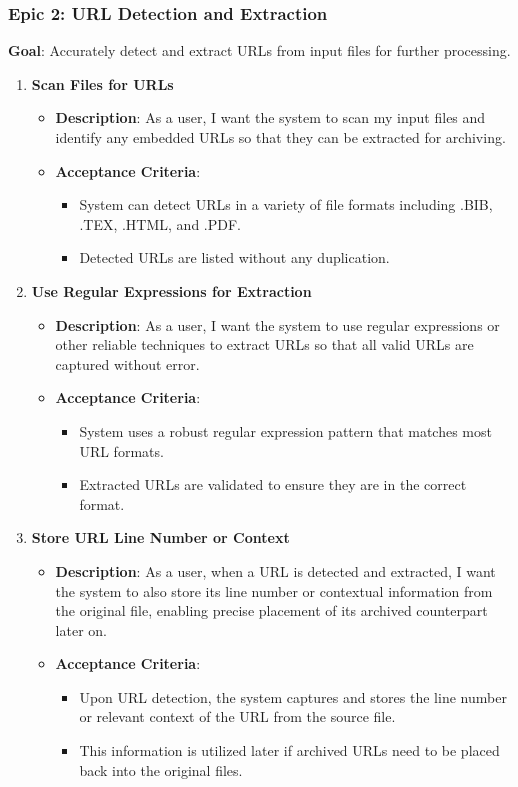 \subsubsection{Epic 2: URL Detection and Extraction}
\textbf{Goal}: Accurately detect and extract URLs from input files for further processing.

\begin{enumerate}
    \item \textbf{Scan Files for URLs}
    \begin{itemize}
        \item \textbf{Description}: As a user, I want the system to scan my input files and identify any embedded URLs so that they can be extracted for archiving.
        \item \textbf{Acceptance Criteria}:
        \begin{itemize}
            \item System can detect URLs in a variety of file formats including .BIB, .TEX, .HTML, and .PDF.
            \item Detected URLs are listed without any duplication.
        \end{itemize}
    \end{itemize}

    \item \textbf{Use Regular Expressions for Extraction}
    \begin{itemize}
        \item \textbf{Description}: As a user, I want the system to use regular expressions or other reliable techniques to extract URLs so that all valid URLs are captured without error.
        \item \textbf{Acceptance Criteria}:
        \begin{itemize}
            \item System uses a robust regular expression pattern that matches most URL formats.
            \item Extracted URLs are validated to ensure they are in the correct format.
        \end{itemize}
    \end{itemize}

    \item \textbf{Store URL Line Number or Context}
    \begin{itemize}
        \item \textbf{Description}: As a user, when a URL is detected and extracted, I want the system to also store its line number or contextual information from the original file, enabling precise placement of its archived counterpart later on.
        \item \textbf{Acceptance Criteria}:
        \begin{itemize}
            \item Upon URL detection, the system captures and stores the line number or relevant context of the URL from the source file.
            \item This information is utilized later if archived URLs need to be placed back into the original files.
        \end{itemize}
    \end{itemize}



\end{enumerate}
